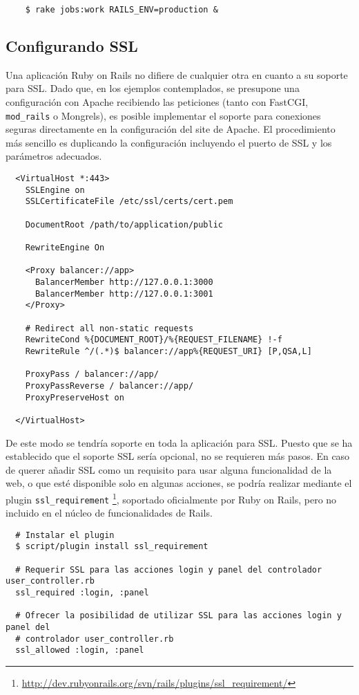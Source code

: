 \begin{verbatim}
	$ rake jobs:work RAILS_ENV=production &
\end{verbatim}


\subsection{Configurando SSL} %
\label{sub:configurando_ssl}

Una aplicación Ruby on Rails no difiere de cualquier otra en cuanto a su soporte para SSL. Dado que, en los ejemplos contemplados, se presupone una configuración con Apache recibiendo las peticiones (tanto con FastCGI, \texttt{mod\_rails} o Mongrels), es posible implementar el soporte para conexiones seguras directamente en la configuración del site de Apache. El procedimiento más sencillo es duplicando la configuración incluyendo el puerto de SSL y los parámetros adecuados.

\begin{verbatim}
  <VirtualHost *:443>
    SSLEngine on
    SSLCertificateFile /etc/ssl/certs/cert.pem

    DocumentRoot /path/to/application/public

    RewriteEngine On

    <Proxy balancer://app>
      BalancerMember http://127.0.0.1:3000
      BalancerMember http://127.0.0.1:3001
    </Proxy>
    
    # Redirect all non-static requests
    RewriteCond %{DOCUMENT_ROOT}/%{REQUEST_FILENAME} !-f
    RewriteRule ^/(.*)$ balancer://app%{REQUEST_URI} [P,QSA,L]

    ProxyPass / balancer://app/
    ProxyPassReverse / balancer://app/
    ProxyPreserveHost on

  </VirtualHost>
\end{verbatim}

De este modo se tendría soporte en toda la aplicación para SSL. Puesto que se ha establecido que el soporte SSL sería opcional, no se requieren más pasos. En caso de querer añadir SSL como un requisito para usar alguna funcionalidad de la web, o que esté disponible solo en algunas acciones, se podría realizar mediante el plugin \texttt{ssl\_requirement} \footnote{\url{http://dev.rubyonrails.org/svn/rails/plugins/ssl\_requirement/}}, soportado oficialmente por Ruby on Rails, pero no incluido en el núcleo de funcionalidades de Rails.

\begin{verbatim}
  # Instalar el plugin
  $ script/plugin install ssl_requirement
  
  # Requerir SSL para las acciones login y panel del controlador user_controller.rb
  ssl_required :login, :panel
  
  # Ofrecer la posibilidad de utilizar SSL para las acciones login y panel del
  # controlador user_controller.rb
  ssl_allowed :login, :panel
\end{verbatim}

